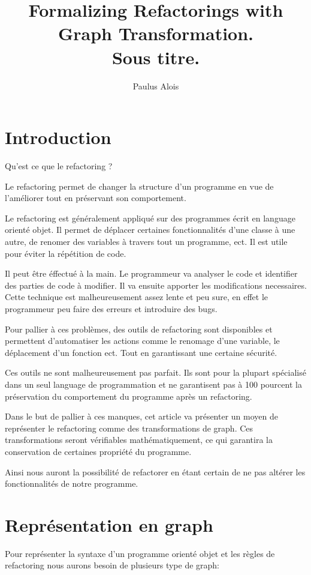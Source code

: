 \documentclass[a4paper, 10pt]{article}
\title{Formalizing Refactorings with Graph Transformation.\\
Sous titre.}
\author{Paulus Alois}
\begin{document}
\maketitle

\tableofcontents

\newpage

\section{Introduction}

Qu'est ce que le refactoring ? 

Le refactoring permet de changer la structure d'un programme en vue de l'améliorer
tout en préservant son comportement. 

Le refactoring est généralement appliqué sur des programmes écrit en language orienté objet. Il permet de déplacer certaines fonctionnalités d'une classe à une autre, de renomer des variables à travers tout un programme, ect. Il est utile pour éviter la répétition de code.

Il peut être éffectué à la main. Le programmeur va analyser le code et identifier des parties de code à modifier. Il va ensuite apporter les modifications necessaires.
Cette technique est malheureusement assez lente et peu sure, en effet le programmeur peu faire des erreurs et introduire des bugs.

Pour pallier à ces problèmes, des outils de refactoring sont disponibles et permettent d'automatiser les actions comme le renomage d'une variable, le déplacement d'un fonction ect. Tout en garantissant une certaine sécurité.

Ces outils ne sont malheureusement pas parfait. Ils sont pour la plupart spécialisé dans un seul language de programmation et ne garantisent pas à 100 pourcent la préservation du comportement du programme après un refactoring.

Dans le but de pallier à ces manques, cet article va présenter un moyen de représenter le refactoring comme des transformations de graph. Ces transformations seront vérifiables mathématiquement, ce qui garantira la conservation de certaines propriété du programme.

Ainsi nous auront la possibilité de refactorer en étant certain de ne pas altérer les fonctionnalités de notre programme.

\section{Représentation en graph}
Pour représenter la syntaxe d'un programme orienté objet et les règles de refactoring nous aurons besoin de plusieurs type de graph:
\end{document}
